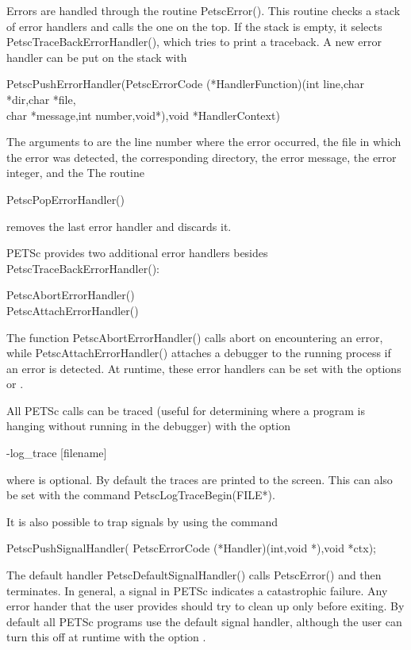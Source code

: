 {{{Errors are handled through the routine PetscError(). 
This routine
checks a stack of error handlers and calls the one on the top.  
If the stack is empty, it selects PetscTraceBackErrorHandler(), 
which tries to print a traceback. 
A new error handler can be put on the stack with
\begin{tabbing}
  PetscPushErrorHandler(PetscErrorCode (*HandlerFunction)(int line,char *dir,char *file,\\
                                char *message,int number,void*),void *HandlerContext)
\end{tabbing}
The arguments to  are the line number where 
the error occurred, the file in which the error was detected, the corresponding
directory, the error message, the error integer, and the 
The routine
\begin{tabbing} 
  PetscPopErrorHandler()
\end{tabbing}
removes the last error handler and discards it.

PETSc provides two additional error handlers besides 
PetscTraceBackErrorHandler():
\begin{tabbing}
   PetscAbortErrorHandler()\\
   PetscAttachErrorHandler()
\end{tabbing}
The function PetscAbortErrorHandler() calls abort on encountering an error, while
PetscAttachErrorHandler() attaches a debugger to the running process
if an error is detected. At runtime, these error handlers can be set
with the options  or   .

All PETSc calls can be traced (useful for determining where a program is 
hanging without running in the debugger) with the option
\begin{tabbing}
  -log\_trace [filename]
\end{tabbing}
where  is optional. By default the traces are printed to the 
screen.  This can also be set with the 
command PetscLogTraceBegin(FILE*). 


It is also possible to trap signals by using the 
command
\begin{tabbing}
  PetscPushSignalHandler( PetscErrorCode (*Handler)(int,void *),void *ctx);
\end{tabbing}
The default handler PetscDefaultSignalHandler() 
calls
PetscError() and then terminates. In general, a signal in PETSc
indicates a catastrophic failure.  Any error hander that the user provides
should try to clean up only before exiting.  By default all PETSc programs
use the default signal handler, although the user can turn this off 
at runtime with the 
option  .

}}}
